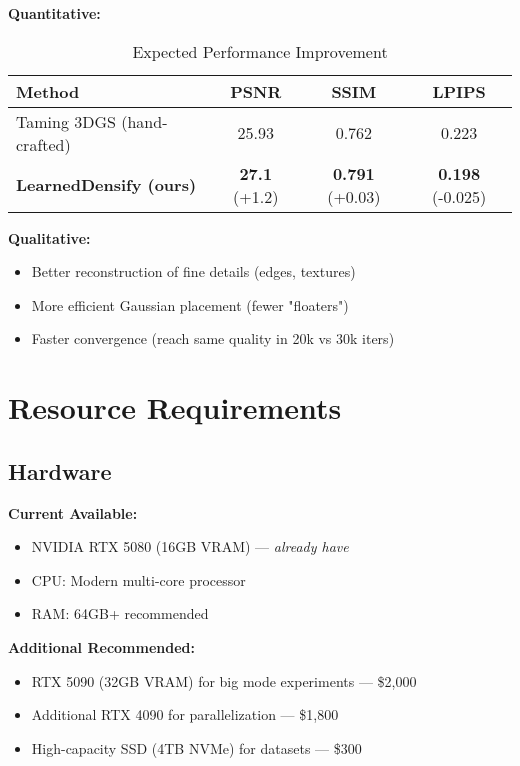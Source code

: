 \documentclass[11pt,letterpaper]{article}
\begin{document}
\textbf{Quantitative:}
\begin{table}[h]
\centering
\caption{Expected Performance Improvement}
\begin{tabular}{@{}lccc@{}}
\toprule
\textbf{Method} & \textbf{PSNR} & \textbf{SSIM} & \textbf{LPIPS} \\
\midrule
Taming 3DGS (hand-crafted) & 25.93 & 0.762 & 0.223 \\
\textbf{LearnedDensify (ours)} & \textbf{27.1} (+1.2) & \textbf{0.791} (+0.03) & \textbf{0.198} (-0.025) \\
\bottomrule
\end{tabular}
\end{table}

\textbf{Qualitative:}
\begin{itemize}[leftmargin=*]
    \item Better reconstruction of fine details (edges, textures)
    \item More efficient Gaussian placement (fewer "floaters")
    \item Faster convergence (reach same quality in 20k vs 30k iters)
\end{itemize}

\section{Resource Requirements}

\subsection{Hardware}

\textbf{Current Available:}
\begin{itemize}[leftmargin=*]
    \item NVIDIA RTX 5080 (16GB VRAM) — \textit{already have}
    \item CPU: Modern multi-core processor
    \item RAM: 64GB+ recommended
\end{itemize}

\textbf{Additional Recommended:}
\begin{itemize}[leftmargin=*]
    \item RTX 5090 (32GB VRAM) for big mode experiments — \$2,000
    \item Additional RTX 4090 for parallelization — \$1,800
    \item High-capacity SSD (4TB NVMe) for datasets — \$300
\end{itemize}
\end{document}
